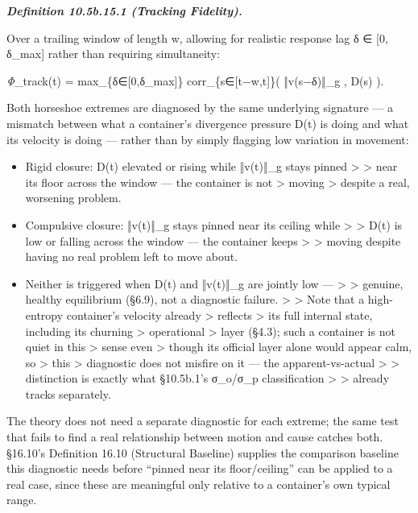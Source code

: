 \documentclass[
]{article}
\begin{document}
\emph{\textbf{Definition 10.5b.15.1 (Tracking Fidelity).}}

Over a trailing window of length w, allowing for realistic response lag
δ ∈ {[}0, δ\_max{]} rather than requiring simultaneity:

\emph{Φ}\_track(t) = max\_\{δ∈{[}0,δ\_max{]}\} corr\_\{s∈{[}t−w,t{]}\}(
‖v(s−δ)‖\_g , D(s) ).

Both horseshoe extremes are diagnosed by the same underlying signature
--- a mismatch between what a container's divergence pressure D(t) is
doing and what its velocity is doing --- rather than by simply flagging
low variation in movement:

\begin{itemize}
\item
  Rigid closure: D(t) elevated or rising while ‖v(t)‖\_g stays pinned
  \textgreater{} \textgreater{} near its floor across the window --- the
  container is not \textgreater{} moving \textgreater{} despite a real,
  worsening problem.
\item
  Compulsive closure: ‖v(t)‖\_g stays pinned near its ceiling while
  \textgreater{} \textgreater{} D(t) is low or falling across the window
  --- the container keeps \textgreater{} \textgreater{} moving despite
  having no real problem left to move about.
\item
  Neither is triggered when D(t) and ‖v(t)‖\_g are jointly low ---
  \textgreater{} \textgreater{} genuine, healthy equilibrium (§6.9), not
  a diagnostic failure. \textgreater{} \textgreater{} Note that a
  high-entropy container's velocity already \textgreater{} reflects
  \textgreater{} its full internal state, including its churning
  \textgreater{} operational \textgreater{} layer (§4.3); such a
  container is not quiet in this \textgreater{} sense even
  \textgreater{} though its official layer alone would appear calm, so
  \textgreater{} this \textgreater{} diagnostic does not misfire on it
  --- the apparent-vs-actual \textgreater{} \textgreater{} distinction
  is exactly what §10.5b.1's σ\_o/σ\_p classification \textgreater{}
  \textgreater{} already tracks separately.
\end{itemize}

The theory does not need a separate diagnostic for each extreme; the
same test that fails to find a real relationship between motion and
cause catches both. §16.10's Definition 16.10 (Structural Baseline)
supplies the comparison baseline this diagnostic needs before ``pinned
near its floor/ceiling'' can be applied to a real case, since these are
meaningful only relative to a container's own typical range.
\end{document}
